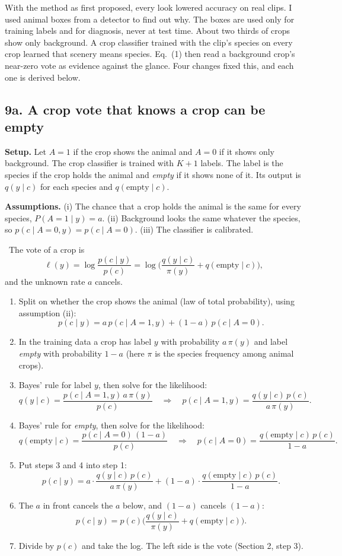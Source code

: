 \documentclass[11pt]{article}
\newcommand{\Want}{\par\medskip\noindent{\sffamily\bfseries\color{headblue}What to show.}\ }
\newcommand{\Steps}{\par\smallskip\noindent{\sffamily\bfseries\color{headblue}Steps.}\par}
\newenvironment{steps}{\begin{enumerate}[label=\textbf{\arabic*.},leftmargin=2em,itemsep=6pt]}{\end{enumerate}}
\begin{document}
With the method as first proposed, every look lowered accuracy on real clips. I used animal boxes from a detector to find out why. The boxes are used only for training labels and for diagnosis, never at test time. About two thirds of crops show only background. A crop classifier trained with the clip's species on every crop learned that scenery means species. Eq.~(1) then read a background crop's near-zero vote as evidence against the glance. Four changes fixed this, and each one is derived below.

\subsection*{9a. A crop vote that knows a crop can be empty}

\textbf{Setup.} Let $A=1$ if the crop shows the animal and $A=0$ if it shows only background. The crop classifier is trained with $K+1$ labels. The label is the species if the crop holds the animal and \emph{empty} if it shows none of it. Its output is $q(y\mid c)$ for each species and $q(\text{empty}\mid c)$.

\textbf{Assumptions.} (i) The chance that a crop holds the animal is the same for every species, $P(A=1\mid y)=a$. (ii) Background looks the same whatever the species, so $p(c\mid A=0,y)=p(c\mid A=0)$. (iii) The classifier is calibrated.

\Want The vote of a crop is
\[ \ell(y)=\log\frac{p(c\mid y)}{p(c)}=\log\Big(\frac{q(y\mid c)}{\pi(y)}+q(\text{empty}\mid c)\Big), \]
and the unknown rate $a$ cancels.

\Steps
\begin{steps}
  \item Split on whether the crop shows the animal (law of total probability), using assumption (ii):
  \[ p(c\mid y)=a\,p(c\mid A=1,y)+(1-a)\,p(c\mid A=0). \]
  \item In the training data a crop has label $y$ with probability $a\,\pi(y)$ and label \emph{empty} with probability $1-a$ (here $\pi$ is the species frequency among animal crops).
  \item Bayes' rule for label $y$, then solve for the likelihood:
  \[ q(y\mid c)=\frac{p(c\mid A=1,y)\,a\,\pi(y)}{p(c)}\quad\Longrightarrow\quad p(c\mid A=1,y)=\frac{q(y\mid c)\,p(c)}{a\,\pi(y)}. \]
  \item Bayes' rule for \emph{empty}, then solve for the likelihood:
  \[ q(\text{empty}\mid c)=\frac{p(c\mid A=0)\,(1-a)}{p(c)}\quad\Longrightarrow\quad p(c\mid A=0)=\frac{q(\text{empty}\mid c)\,p(c)}{1-a}. \]
  \item Put steps 3 and 4 into step 1:
  \[ p(c\mid y)=a\cdot\frac{q(y\mid c)\,p(c)}{a\,\pi(y)}+(1-a)\cdot\frac{q(\text{empty}\mid c)\,p(c)}{1-a}. \]
  \item The $a$ in front cancels the $a$ below, and $(1-a)$ cancels $(1-a)$:
  \[ p(c\mid y)=p(c)\Big(\frac{q(y\mid c)}{\pi(y)}+q(\text{empty}\mid c)\Big). \]
  \item Divide by $p(c)$ and take the log. The left side is the vote (Section 2, step 3).
\end{steps}
\end{document}
